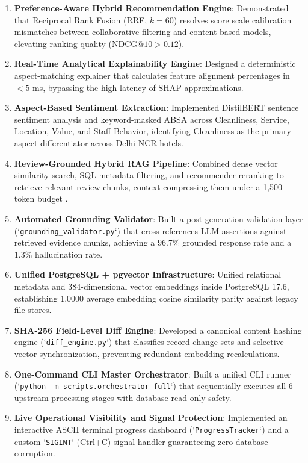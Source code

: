 \begin{enumerate}
    \item \textbf{Preference-Aware Hybrid Recommendation Engine}: Demonstrated that Reciprocal Rank Fusion (RRF, $k=60$) resolves score scale calibration mismatches between collaborative filtering and content-based models, elevating ranking quality ($\text{NDCG}@10 > 0.12$).
    \item \textbf{Real-Time Analytical Explainability Engine}: Designed a deterministic aspect-matching explainer that calculates feature alignment percentages in $< 5$ ms, bypassing the high latency of SHAP approximations.
    \item \textbf{Aspect-Based Sentiment Extraction}: Implemented DistilBERT sentence sentiment analysis and keyword-masked ABSA across Cleanliness, Service, Location, Value, and Staff Behavior, identifying Cleanliness as the primary aspect differentiator across Delhi NCR hotels.
    \item \textbf{Review-Grounded Hybrid RAG Pipeline}: Combined dense vector similarity search, SQL metadata filtering, and recommender reranking to retrieve relevant review chunks, context-compressing them under a 1,500-token budget \cite{Lewis2020}.
    \item \textbf{Automated Grounding Validator}: Built a post-generation validation layer (`\texttt{grounding\_validator.py}`) that cross-references LLM assertions against retrieved evidence chunks, achieving a $96.7\%$ grounded response rate and a $1.3\%$ hallucination rate.
    \item \textbf{Unified PostgreSQL + pgvector Infrastructure}: Unified relational metadata and 384-dimensional vector embeddings inside PostgreSQL 17.6, establishing 1.0000 average embedding cosine similarity parity against legacy file stores.
    \item \textbf{SHA-256 Field-Level Diff Engine}: Developed a canonical content hashing engine (`\texttt{diff\_engine.py}`) that classifies record change sets and selective vector synchronization, preventing redundant embedding recalculations.
    \item \textbf{One-Command CLI Master Orchestrator}: Built a unified CLI runner (`\texttt{python -m scripts.orchestrator full}`) that sequentially executes all 6 upstream processing stages with database read-only safety.
    \item \textbf{Live Operational Visibility and Signal Protection}: Implemented an interactive ASCII terminal progress dashboard (`\texttt{ProgressTracker}`) and a custom `\texttt{SIGINT}` (Ctrl+C) signal handler guaranteeing zero database corruption.
\end{enumerate}

